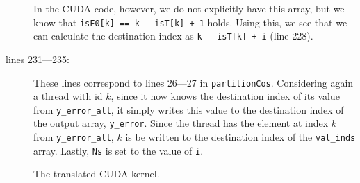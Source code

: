 \begin{description}
    In the CUDA code, however, we do not explicitly have this array, but we
    know that \texttt{isF0[k] == k - isT[k] + 1} holds.
    Using this, we see that we can calculate the destination index as
    \texttt{k - isT[k] + i} (line 228). %

  \item[lines 231---235:] %
    These lines correspond to lines 26---27 in \texttt{partitionCos}.
    Considering again a thread with id \(k\), since it now knows the
    destination index of its value from \texttt{y\_error\_all}, it simply
    writes this value to the destination index of the output array,
    \texttt{y\_error}.
    Since the thread has the element at index \(k\) from
    \texttt{y\_error\_all}, \(k\) is be written to the destination index of the
    \texttt{val\_inds} array.
    Lastly, \texttt{Ns} is set to the value of \texttt{i}.
\end{description}

\begin{figure}[H]
    \centering
    \caption{The translated CUDA kernel.}
    \label{cuda:kernel5}
\end{figure}



